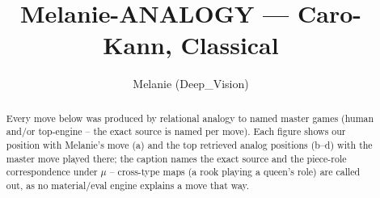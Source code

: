 \documentclass[11pt]{article}
\title{Melanie-ANALOGY — Caro-Kann, Classical}
\author{Melanie (Deep\_Vision)}
\date{}
\begin{document}
\maketitle

\begin{abstract}Every move below was produced by relational analogy to named master games (human and/or top-engine -- the exact source is named per move). Each figure shows our position with Melanie's move (a) and the top retrieved analog positions (b--d) with the master move played there; the caption names the exact source and the piece-role correspondence under $\mu$ -- cross-type maps (a rook playing a queen's role) are called out, as no material/eval engine explains a move that way.\end{abstract}

\begin{figure}[p]\centering
\begin{subfigure}{0.46\textwidth}\centering
\resizebox{\linewidth}{!}{%
\newchessgame
\chessboard[
  setfen={rn1qkbnr/pp2ppp1/2p3bp/8/3P1P1P/6N1/PPP3P1/R1BQKBNR b KQkq - 0 7},
  showmover=false,
  pgfstyle=straightmove, color=movearrow, markmove={g8-f6}
]}
\caption{}
\end{subfigure}\hfill
\begin{subfigure}{0.46\textwidth}\centering
\resizebox{\linewidth}{!}{%
\newchessgame
\chessboard[
  setfen={rn1qkbnr/pp2pppp/2p3b1/8/3P3P/6N1/PPP2PP1/R1BQKBNR b KQkq - 0 6},
  showmover=false,
  pgfstyle=straightmove, color=movearrow, markmove={h7-h6}
]}
\caption{}
\end{subfigure}
\\[4pt]
\begin{subfigure}{0.46\textwidth}\centering
\resizebox{\linewidth}{!}{%
\newchessgame
\chessboard[
  setfen={rn1qkbnr/pp2pppp/2p3b1/8/3P3P/6N1/PPP2PP1/R1BQKBNR b KQkq - 0 6},
  showmover=false,
  pgfstyle=straightmove, color=movearrow, markmove={h7-h6}
]}
\caption{}
\end{subfigure}\hfill
\begin{subfigure}{0.46\textwidth}\centering
\resizebox{\linewidth}{!}{%
\newchessgame
\chessboard[
  setfen={rn1qkbnr/pp2pppp/2p3b1/8/3P3P/6N1/PPP2PP1/R1BQKBNR b KQkq - 0 6},
  showmover=false,
  pgfstyle=straightmove, color=movearrow, markmove={h7-h6}
]}
\caption{}
\end{subfigure}

\end{figure}
\end{document}
